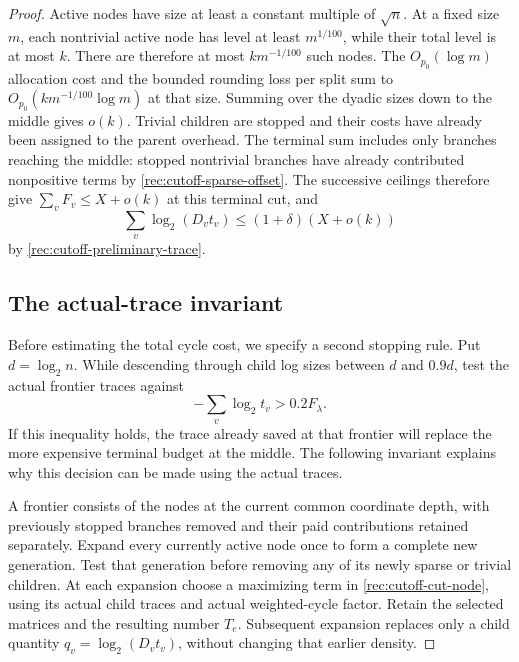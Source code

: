 \begin{proof}
Active nodes have size at least a constant multiple of $\sqrt n$.
At a fixed size $m$, each nontrivial active node has level at least
$m^{1/100}$, while their total level is at most $k$.  There are therefore
at most $k m^{-1/100}$ such nodes.  The $O_{p_0}(\log m)$ allocation
cost and the bounded rounding loss per split sum to
$O_{p_0}(k m^{-1/100}\log m)$ at that size.  Summing over the dyadic
sizes down to the middle gives $o(k)$.  Trivial children are stopped and
their costs have already been assigned to the parent overhead.  The
terminal sum includes only branches reaching the middle: stopped
nontrivial branches have already contributed nonpositive terms by
\eqref{rec:cutoff-sparse-offset}.  The successive ceilings therefore give
$\sum_vF_v\le X+o(k)$ at this terminal cut, and
\begin{equation}\label{rec:cutoff-terminal-budget}
 \sum_v\log_2(D_vt_v)\le(1+\delta)(X+o(k))
\end{equation}
by \eqref{rec:cutoff-preliminary-trace}.

\subsection{The actual-trace invariant}

Before estimating the total cycle cost, we specify a second stopping rule.
Put $d=\log_2n$.  While descending through child log sizes between
$d$ and $0.9d$, test the actual frontier traces against
\begin{equation}\label{rec:cutoff-diagnostic}
                 -\sum_v\log_2t_v>0.2F_\lambda.
\end{equation}
If this inequality holds, the trace already saved at that frontier will
replace the more expensive terminal budget at the middle.  The following
invariant explains why this decision can be made using the actual traces.

A frontier consists of the nodes at the current common coordinate depth,
with previously stopped branches removed and their paid contributions
retained separately.  Expand every currently active node once to form a
complete new generation.  Test that generation before removing any of
its newly sparse or trivial children.  At each expansion choose a
maximizing term in
\eqref{rec:cutoff-cut-node}, using its actual child traces and actual
weighted-cycle factor.  Retain the selected matrices and the resulting
number $T_e$.  Subsequent expansion replaces only a child quantity
$q_v=\log_2(D_vt_v)$, without changing that earlier density.


\end{proof}
